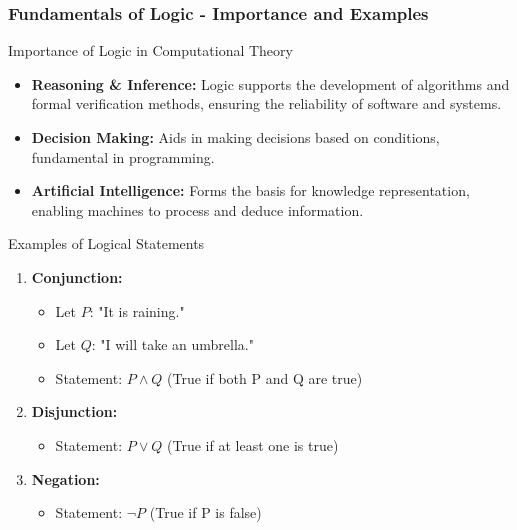 \documentclass[aspectratio=169]{beamer}
\begin{document}
\begin{frame}[fragile]
    \frametitle{Fundamentals of Logic - Importance and Examples}
    \begin{block}{Importance of Logic in Computational Theory}
        \begin{itemize}
            \item \textbf{Reasoning \& Inference:} Logic supports the development of algorithms and formal verification methods, ensuring the reliability of software and systems.
            \item \textbf{Decision Making:} Aids in making decisions based on conditions, fundamental in programming.
            \item \textbf{Artificial Intelligence:} Forms the basis for knowledge representation, enabling machines to process and deduce information.
        \end{itemize}
    \end{block}
    
    \begin{block}{Examples of Logical Statements}
        \begin{enumerate}
            \item \textbf{Conjunction:} 
                \begin{itemize}
                    \item Let \( P \): "It is raining."
                    \item Let \( Q \): "I will take an umbrella."
                    \item Statement: \( P \land Q \) (True if both P and Q are true)
                \end{itemize}

            \item \textbf{Disjunction:}
                \begin{itemize}
                    \item Statement: \( P \lor Q \) (True if at least one is true)
                \end{itemize}

            \item \textbf{Negation:}
                \begin{itemize}
                    \item Statement: \( \neg P \) (True if P is false)
                \end{itemize}
        \end{enumerate}
    \end{block}
\end{frame}
\end{document}
